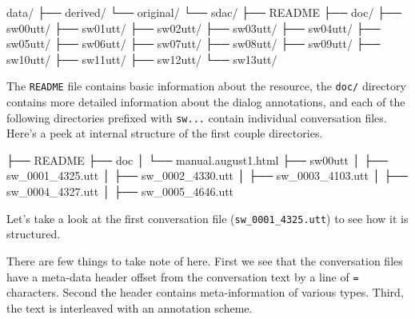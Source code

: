 \documentclass[
  letterpaper,
  DIV=11,
  numbers=noendperiod]{scrreport}
\newenvironment{Shaded}{\begin{snugshade}}{\end{snugshade}}
\newcommand{\ExtensionTok}[1]{\textcolor[rgb]{0.00,0.00,0.00}{#1}}
\newcommand{\NormalTok}[1]{\textcolor[rgb]{0.00,0.00,0.00}{#1}}
\theoremstyle{definition}
\theoremstyle{remark}
\begin{document}
\begin{Shaded}
\begin{Highlighting}[]
\ExtensionTok{data/}
\ExtensionTok{├──}\NormalTok{ derived/}
\ExtensionTok{└──}\NormalTok{ original/}
    \ExtensionTok{└──}\NormalTok{ sdac/}
        \ExtensionTok{├──}\NormalTok{ README}
        \ExtensionTok{├──}\NormalTok{ doc/}
        \ExtensionTok{├──}\NormalTok{ sw00utt/}
        \ExtensionTok{├──}\NormalTok{ sw01utt/}
        \ExtensionTok{├──}\NormalTok{ sw02utt/}
        \ExtensionTok{├──}\NormalTok{ sw03utt/}
        \ExtensionTok{├──}\NormalTok{ sw04utt/}
        \ExtensionTok{├──}\NormalTok{ sw05utt/}
        \ExtensionTok{├──}\NormalTok{ sw06utt/}
        \ExtensionTok{├──}\NormalTok{ sw07utt/}
        \ExtensionTok{├──}\NormalTok{ sw08utt/}
        \ExtensionTok{├──}\NormalTok{ sw09utt/}
        \ExtensionTok{├──}\NormalTok{ sw10utt/}
        \ExtensionTok{├──}\NormalTok{ sw11utt/}
        \ExtensionTok{├──}\NormalTok{ sw12utt/}
        \ExtensionTok{└──}\NormalTok{ sw13utt/}
\end{Highlighting}
\end{Shaded}

The \texttt{README} file contains basic information about the resource,
the \texttt{doc/} directory contains more detailed information about the
dialog annotations, and each of the following directories prefixed with
\texttt{sw...} contain individual conversation files. Here's a peek at
internal structure of the first couple directories.

\begin{Shaded}
\begin{Highlighting}[]
\ExtensionTok{├──}\NormalTok{ README}
\ExtensionTok{├──}\NormalTok{ doc}
\ExtensionTok{│}\NormalTok{   └── manual.august1.html}
\ExtensionTok{├──}\NormalTok{ sw00utt}
\ExtensionTok{│}\NormalTok{   ├── sw\_0001\_4325.utt}
\ExtensionTok{│}\NormalTok{   ├── sw\_0002\_4330.utt}
\ExtensionTok{│}\NormalTok{   ├── sw\_0003\_4103.utt}
\ExtensionTok{│}\NormalTok{   ├── sw\_0004\_4327.utt}
\ExtensionTok{│}\NormalTok{   ├── sw\_0005\_4646.utt}
\end{Highlighting}
\end{Shaded}

Let's take a look at the first conversation file
(\texttt{sw\_0001\_4325.utt}) to see how it is structured.

There are few things to take note of here. First we see that the
conversation files have a meta-data header offset from the conversation
text by a line of \texttt{=} characters. Second the header contains
meta-information of various types. Third, the text is interleaved with
an annotation scheme.
\end{document}
